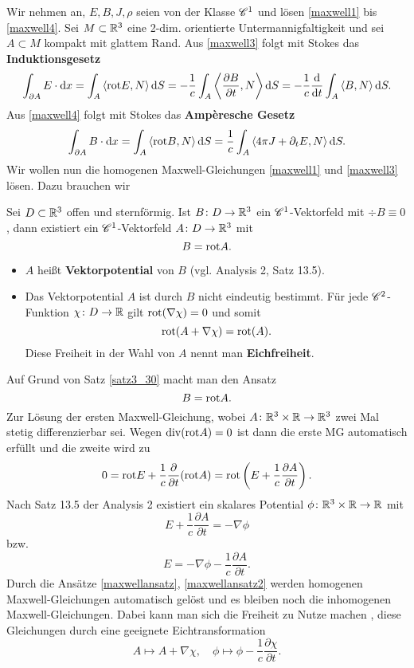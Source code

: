 Wir nehmen an, $E,B,J,\rho$ seien von der Klasse $\mathscr{C}^1$ und lösen \eqref{maxwell1} bis \eqref{maxwell4}. 
Sei $M \subset \mathbb{R}^3$ eine 2-dim. orientierte Untermannigfaltigkeit und sei $A \subset M$ kompakt mit glattem Rand. Aus \eqref{maxwell3} folgt mit Stokes das \textbf{Induktionsgesetz}
\begin{align*}
	\int_{\partial A} E \cdot \mathrm{d} x = \int_A \left\langle\mathrm{rot} E,N \right\rangle \mathrm{d} S = -\frac{1}{c} \int_A \left\langle\frac{\partial B}{\partial t},N \right\rangle \mathrm{d} S = -\frac{1}{c} \frac{\mathrm{d}}{\mathrm{d} t} \int_A \left\langle B,N \right\rangle \mathrm{d} S.
\end{align*}
Aus \eqref{maxwell4} folgt mit Stokes das \textbf{Ampèresche Gesetz}
\begin{align*}
	\int_{\partial A} B \cdot \mathrm{d} x = \int_A \left\langle\mathrm{rot} B,N \right\rangle \mathrm{d} S = \frac{1}{c} \int_A \left\langle4\pi J + \partial_t E,N \right\rangle \mathrm{d} S.
\end{align*}
Wir wollen nun die homogenen Maxwell-Gleichungen \eqref{maxwell1} und \eqref{maxwell3} lösen. Dazu brauchen wir
\begin{satz}\label{satz3_30}
	Sei $D \subset \mathbb{R}^3$ offen und sternförmig. Ist $B \colon D \to \mathbb{R}^3$ ein $\mathscr{C}^1$-Vektorfeld mit $\div B \equiv 0$, dann existiert ein $\mathscr{C}^1$-Vektorfeld $A \colon D \to \mathbb{R}^3$ mit
	\[B = \mathrm{rot} A.\]
\end{satz}
\begin{rem}
	\begin{itemize}
	\item $A$ heißt \textbf{Vektorpotential} von $B$ (vgl. Analysis 2, Satz 13.5). 
	\item Das Vektorpotential $A$ ist durch $B$ nicht eindeutig bestimmt. Für jede $\mathscr{C}^2$-Funktion $\chi \colon D \to \mathbb{R}$ gilt $\mathrm{rot}(\nabla \chi) = 0$ und somit
	\[\mathrm{rot}(A + \nabla \chi) = \mathrm{rot}(A).\]
	Diese Freiheit in der Wahl von $A$ nennt man \textbf{Eichfreiheit}.
	\end{itemize}
\end{rem}
Auf Grund von Satz \ref{satz3_30} macht man den Ansatz
\begin{equation}\label{maxwellansatz}
	B = \mathrm{rot} A.
\end{equation}
Zur Lösung der ersten Maxwell-Gleichung, wobei $A \colon \mathbb{R}^3 \times \mathbb{R} \to \mathbb{R}^3$ zwei Mal stetig differenzierbar sei. Wegen $\mathrm{div}(\mathrm{rot} A) = 0$ ist dann die erste MG automatisch erfüllt und die zweite wird zu 
\[0 = \mathrm{rot} E + \frac{1}{c} \frac{\partial}{\partial t} (\mathrm{rot} A) = \mathrm{rot}\left(E + \frac{1}{c} \frac{\partial A}{\partial t}\right).\]
Nach Satz 13.5 der Analysis 2 existiert ein skalares Potential $\phi \colon \mathbb{R}^3 \times \mathbb{R} \to \mathbb{R}$ mit
\[E + \frac{1}{c} \frac{\partial A}{\partial t} = -\nabla \phi\]
bzw.
\begin{equation}\label{maxwellansatz2}
	E = -\nabla \phi - \frac{1}{c} \frac{\partial A}{\partial t}.
\end{equation}
Durch die Ansätze \eqref{maxwellansatz}, \eqref{maxwellansatz2} werden homogenen Maxwell-Gleichungen automatisch gelöst und es bleiben noch die inhomogenen Maxwell-Gleichungen. Dabei kann man sich die Freiheit zu Nutze machen , diese Gleichungen durch eine geeignete Eichtransformation
\[A \mapsto A + \nabla \chi, \quad \phi \mapsto \phi - \frac{1}{c} \frac{\partial \chi}{\partial t}.\]